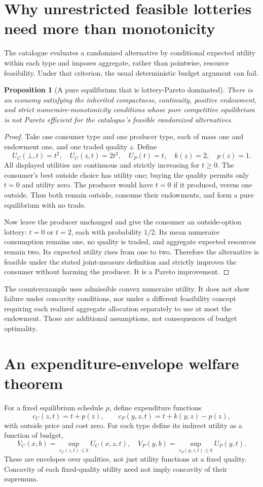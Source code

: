 \documentclass[11pt,a4paper]{article}
\newtheorem{proposition}[theorem]{Proposition}
\theoremstyle{remark}
\begin{document}
\section{Why unrestricted feasible lotteries need more than monotonicity}
The catalogue evaluates a randomized alternative by conditional expected utility within each type and imposes aggregate, rather than pointwise, resource feasibility. Under that criterion, the usual deterministic budget argument can fail.

\begin{proposition}[A pure equilibrium that is lottery-Pareto dominated]
There is an economy satisfying the inherited compactness, continuity, positive endowment, and strict numeraire-monotonicity conditions whose pure competitive equilibrium is not Pareto efficient for the catalogue's feasible randomized alternatives.
\end{proposition}
\begin{proof}
Take one consumer type and one producer type, each of mass one and endowment one, and one traded quality $z$. Define
\[
 U_C(\bot,t)=t^2,\quad U_C(z,t)=2t^2,\quad
 U_P(t)=t,\quad k(z)=2,\quad p(z)=1.
\]
All displayed utilities are continuous and strictly increasing for $t\ge0$. The consumer's best outside choice has utility one; buying the quality permits only $t=0$ and utility zero. The producer would have $t=0$ if it produced, versus one outside. Thus both remain outside, consume their endowments, and form a pure equilibrium with no trade.

Now leave the producer unchanged and give the consumer an outside-option lottery: $t=0$ or $t=2$, each with probability $1/2$. Its mean numeraire consumption remains one, no quality is traded, and aggregate expected resources remain two. Its expected utility rises from one to two. Therefore the alternative is feasible under the stated joint-measure definition and strictly improves the consumer without harming the producer. It is a Pareto improvement.
\end{proof}

The counterexample uses admissible convex numeraire utility. It does not show failure under concavity conditions, nor under a different feasibility concept requiring each realized aggregate allocation separately to use at most the endowment. Those are additional assumptions, not consequences of budget optimality.

\section{An expenditure-envelope welfare theorem}
For a fixed equilibrium schedule $p$, define expenditure functions
\[
 c_C(z,t)=t+p(z),\qquad
 c_P(y,z,t)=t+k(y,z)-p(z),
\]
with outside price and cost zero. For each type define its indirect utility as a function of budget,
\[
 V_C(x,b)=\sup_{c_C(z,t)\le b}U_C(x,z,t),\quad
 V_P(y,b)=\sup_{c_P(y,z,t)\le b}U_P(y,t).
\]
These are envelopes over qualities, not just utility functions at a fixed quality. Concavity of each fixed-quality utility need not imply concavity of their supremum.
\end{document}
